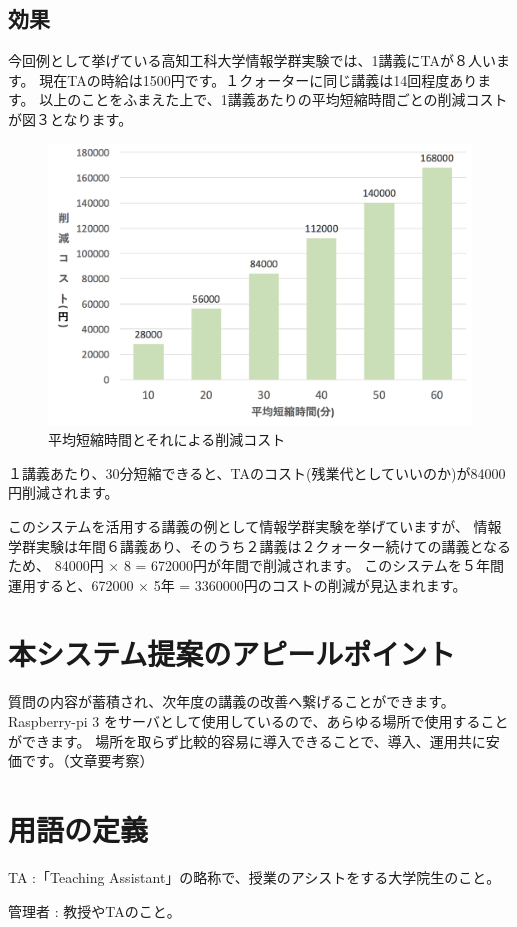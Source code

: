 \documentclass[a4j,titlepage]{ujarticle}
\begin{document}
\subsection{効果}
今回例として挙げている高知工科大学情報学群実験では、1講義にTAが８人います。
現在TAの時給は1500円です。１クォーターに同じ講義は14回程度あります。
以上のことをふまえた上で、1講義あたりの平均短縮時間ごとの削減コストが図３となります。
\begin{figure}[h]

\centering
   \includegraphics[width=13cm]{sisan.png}
  \caption{平均短縮時間とそれによる削減コスト}
\end{figure}


１講義あたり、30分短縮できると、TAのコスト(残業代としていいのか)が84000円削減されます。


このシステムを活用する講義の例として情報学群実験を挙げていますが、
情報学群実験は年間６講義あり、そのうち２講義は２クォーター続けての講義となるため、 84000円 × 8 = 672000円が年間で削減されます。
このシステムを５年間運用すると、672000 × 5年 = 3360000円のコストの削減が見込まれます。

\section{本システム提案のアピールポイント}
質問の内容が蓄積され、次年度の講義の改善へ繋げることができます。
Raspberry-pi 3 をサーバとして使用しているので、あらゆる場所で使用することができます。
場所を取らず比較的容易に導入できることで、導入、運用共に安価です。（文章要考察）


\section{用語の定義}
TA :「Teaching Assistant」の略称で、授業のアシストをする大学院生のこと。

管理者 : 教授やTAのこと。




\newpage
\end{document}
